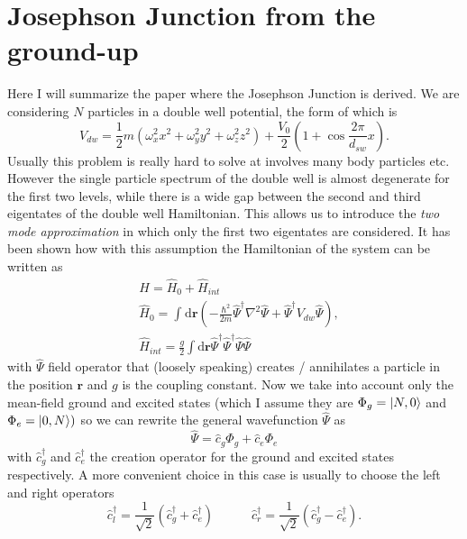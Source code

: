 \section{Josephson Junction from the ground-up}
Here I will summarize the paper \cite{ABosonicJosepGati2007} where the Josephson Junction is derived.
We are considering  $ N $  particles in a double well potential, the form of which is
\begin{equation}
\label{eq:HamiltonianDoubleWell}
V_{dw} = \frac{1}{2} m \left(\omega^2_{x} x^2 + \omega^2_{y} y^2 + \omega^2_{z} z^2\right) + \frac{V_{0}}{2} \left(1 + \cos\frac{2\pi}{d_{sw}} x\right).
\end{equation}
Usually this problem is really hard to solve at involves many body particles etc. However the single particle spectrum of the double well is almost degenerate for the first two levels, while there is a wide gap between the second and third eigentates of the double well Hamiltonian.
This allows us to introduce the \textit{two mode approximation} in which only the first two eigentates are considered.
It has been shown how with this assumption the Hamiltonian of the system can be written as 
\begin{align}
\label{eq:HamiltonianDoubleWellIntegral}
& H = \hat{ H }_{0} + \hat{ H }_{int}\\
& \hat{H}_{0} = \int_{}^{}  \mathrm{d\mathbf{r}}\left(-\frac{\hbar^2}{2m} \hat{\Psi}^{\dag}\nabla^2\hat{ \Psi } + \hat{\Psi}^{\dag}V_{dw}\hat{ \Psi }\right)	,\\
& \hat{H}_{int} = \frac{g}{2}\int \mathrm{d\mathbf{r}} \hat{\Psi}^{\dag}\hat{\Psi}^{\dag}\hat{ \Psi }\hat{ \Psi }
\end{align}
with $ \hat{\Psi} $ field operator that (loosely speaking) creates / annihilates a particle in the position $ \mathbf{r} $ and $ g $ is the coupling constant.
Now we take into account only the mean-field ground and excited states (which I assume they are $\Phi_g = \ket{N,0}$ and  $\Phi_e = \ket{0,N})$ so we can rewrite the general wavefunction $\hat{ \Psi }$ as
\begin{equation}
\label{eq:GeneralState}
\hat{\Psi} = \hat{c}_{g}\Phi_g + \hat{c}_{e}\Phi_e
\end{equation}
with $\hat{c}_g^{\dagger} $ and $\hat{c}_e^{\dagger} $ the creation operator for the ground and excited states respectively.
A more convenient choice in this case is usually to choose the left and right operators
\begin{equation}
\label{eq:LeftRightOperators}
\hat{c}_l^{\dagger} = \frac{1}{\sqrt{2}  }\left( \hat{c}_g^{\dagger} + \hat{c}_e^{\dagger} \right)   \hspace{3em}\hat{c}_r^{\dagger} = \frac{1}{\sqrt{2}  }\left( \hat{c}_g^{\dagger} - \hat{c}_e^{\dagger} \right)  .
\end{equation}
